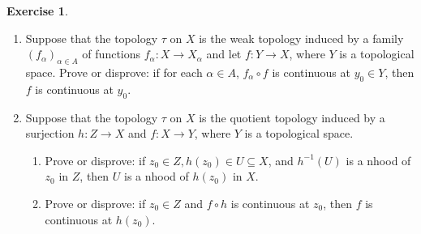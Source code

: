 \documentclass[12pt]{extarticle}
\newcommand{\<}{\langle}
\renewcommand{\>}{\rangle}
\theoremstyle{definition}
\newtheorem{exercise}{Exercise}
\begin{document}
\begin{exercise}
  \begin{enumerate}
  \item
    Suppose that the topology $\tau$ on $X$ is the weak topology induced by a family $(f_{\alpha})_{\alpha \in A}$ of functions $f_{\alpha}: X \to X_{\alpha}$ and let
    $f: Y \to X$, where $Y$ is a topological space. Prove or disprove: if for each $\alpha \in A$, $f_{\alpha} \circ f$ is continuous at $y_0 \in Y$,
    then $f$ is continuous at $y_0$.
  \item
    Suppose that the topology $\tau$ on $X$ is the quotient topology induced by a surjection $h:Z \to X$ and $f:X \to Y$, where $Y$ is a topological space.
    \begin{enumerate}
    \item
      Prove or disprove: if $z_0 \in Z, h(z_0) \in U \subseteq X$, and $h^{-1}(U)$ is a nhood of $z_0$ in $Z$, then $U$ is a nhood of $h(z_0)$ in $X$.
    \item
      Prove or disprove: if $z_0 \in Z$ and $f \circ h$ is continuous at $z_0$, then $f$ is continuous at $h(z_0)$. 
    \end{enumerate}
  \end{enumerate}
\end{exercise}
\end{document}

